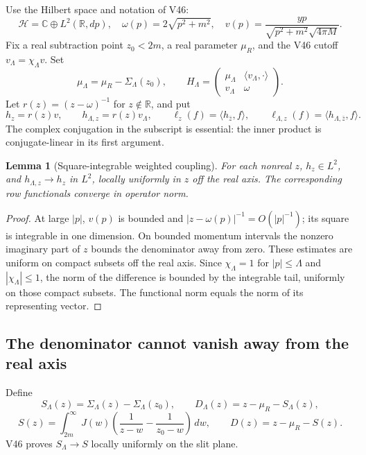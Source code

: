 \documentclass[11pt]{article}
\newtheorem{lemma}[theorem]{Lemma}
\theoremstyle{remark}
\begin{document}
Use the Hilbert space and notation of V46:
\[
 \mathcal H=\mathbb C\oplus L^2(\mathbb R,dp),\quad
 \omega(p)=2\sqrt{p^2+m^2},\quad
 v(p)=\frac{yp}{\sqrt{p^2+m^2}\sqrt{4\pi M}}.
\]
Fix a real subtraction point \(z_0<2m\), a real parameter \(\mu_R\),
and the V46 cutoff \(v_\Lambda=\chi_\Lambda v\).  Set
\[
 \mu_\Lambda=\mu_R-\Sigma_\Lambda(z_0),\qquad
 H_\Lambda=
 \begin{pmatrix}\mu_\Lambda&\langle v_\Lambda,\cdot\rangle\\
                 v_\Lambda&\omega\end{pmatrix}.
\]
Let \(r(z)=(z-\omega)^{-1}\) for \(z\notin\mathbb R\), and put
\[
 h_z=r(z)v,\qquad h_{\Lambda,z}=r(z)v_\Lambda,\qquad
 \ell_z(f)=\langle h_{\bar z},f\rangle,\qquad
 \ell_{\Lambda,z}(f)=\langle h_{\Lambda,\bar z},f\rangle.
\]
The complex conjugation in the subscript is essential: the inner
product is conjugate-linear in its first argument.

\begin{lemma}[Square-integrable weighted coupling]
\label{lem:v20v47-weight}
For each nonreal \(z\), \(h_z\in L^2\), and
\(h_{\Lambda,z}\to h_z\) in \(L^2\), locally uniformly in \(z\)
off the real axis.  The corresponding row functionals converge
in operator norm.
\end{lemma}
\begin{proof}
At large \(|p|\), \(v(p)\) is bounded and
\(|z-\omega(p)|^{-1}=O(|p|^{-1})\); its square is integrable in one
dimension.  On bounded momentum intervals the nonzero imaginary part
of \(z\) bounds the denominator away from zero.  These estimates
are uniform on compact subsets off the real axis.  Since
\(\chi_\Lambda=1\) for \(|p|\leq\Lambda\) and
\(|\chi_\Lambda|\leq1\), the norm of the difference is bounded by
the integrable tail, uniformly on those compact subsets.  The
functional norm equals the norm of its representing vector.
\end{proof}

\subsection{The denominator cannot vanish away from the real axis}

Define
\[
 S_\Lambda(z)=\Sigma_\Lambda(z)-\Sigma_\Lambda(z_0),\qquad
 D_\Lambda(z)=z-\mu_R-S_\Lambda(z),
\]
\[
 S(z)=\int_{2m}^\infty J(w)
 \left(\frac1{z-w}-\frac1{z_0-w}\right)\,dw,\qquad
 D(z)=z-\mu_R-S(z).
\]
V46 proves \(S_\Lambda\to S\) locally uniformly on the slit plane.
\end{document}

